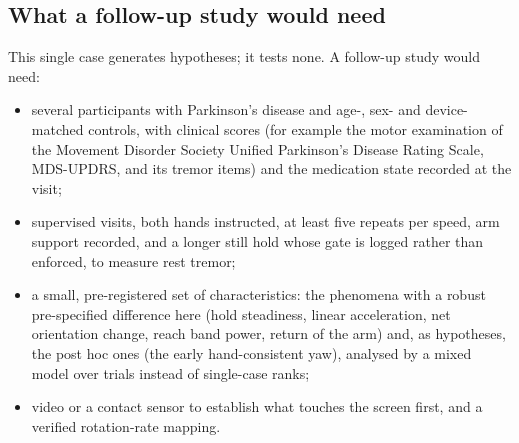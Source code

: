 
\FloatBarrier
\subsection{What a follow-up study would need}\label{app:pd01:followup}

This single case generates hypotheses; it tests none.
A follow-up study would need:
\begin{itemize}[nosep]
  \item several participants with Parkinson's disease and age-, sex- and device-matched controls, with clinical scores (for example the motor examination of the Movement Disorder Society Unified Parkinson's Disease Rating Scale, MDS-UPDRS, and its tremor items) and the medication state recorded at the visit;
  \item supervised visits, both hands instructed, at least five repeats per speed, arm support recorded, and a longer still hold whose gate is logged rather than enforced, to measure rest tremor;
  \item a small, pre-registered set of characteristics: the phenomena with a robust pre-specified difference here (hold steadiness, linear acceleration, net orientation change, reach band power, return of the arm) and, as hypotheses, the post hoc ones (the early hand-consistent yaw), analysed by a mixed model over trials instead of single-case ranks;
  \item video or a contact sensor to establish what touches the screen first, and a verified rotation-rate mapping.
\end{itemize}
